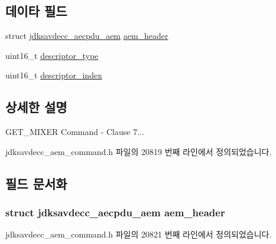 \subsection*{데이타 필드}
\begin{DoxyCompactItemize}
\item 
struct \hyperlink{structjdksavdecc__aecpdu__aem}{jdksavdecc\+\_\+aecpdu\+\_\+aem} \hyperlink{structjdksavdecc__aem__command__get__mixer_ae1e77ccb75ff5021ad923221eab38294}{aem\+\_\+header}
\item 
uint16\+\_\+t \hyperlink{structjdksavdecc__aem__command__get__mixer_ab7c32b6c7131c13d4ea3b7ee2f09b78d}{descriptor\+\_\+type}
\item 
uint16\+\_\+t \hyperlink{structjdksavdecc__aem__command__get__mixer_a042bbc76d835b82d27c1932431ee38d4}{descriptor\+\_\+index}
\end{DoxyCompactItemize}


\subsection{상세한 설명}
G\+E\+T\+\_\+\+M\+I\+X\+ER Command -\/ Clause 7... 

jdksavdecc\+\_\+aem\+\_\+command.\+h 파일의 20819 번째 라인에서 정의되었습니다.



\subsection{필드 문서화}
\subsubsection[{\texorpdfstring{aem\+\_\+header}{aem_header}}]{\setlength{\rightskip}{0pt plus 5cm}struct {\bf jdksavdecc\+\_\+aecpdu\+\_\+aem} aem\+\_\+header}\hypertarget{structjdksavdecc__aem__command__get__mixer_ae1e77ccb75ff5021ad923221eab38294}{}\label{structjdksavdecc__aem__command__get__mixer_ae1e77ccb75ff5021ad923221eab38294}


jdksavdecc\+\_\+aem\+\_\+command.\+h 파일의 20821 번째 라인에서 정의되었습니다.

